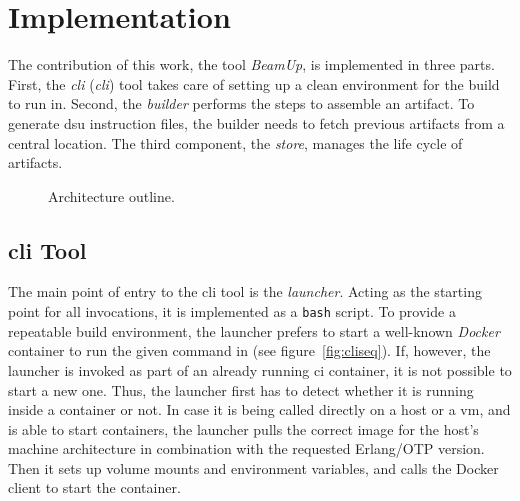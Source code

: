 \section{Implementation}

The contribution of this work, the tool \emph{BeamUp}, is implemented in three parts. First, the \emph{\acrlong{cli}} (\emph{\acrshort{cli}}) tool takes care of setting up a clean environment for the build to run in. Second, the \emph{builder} performs the  steps to assemble an artifact. To generate \acrshort{dsu} instruction files, the builder needs to fetch previous artifacts from a central location. The third component, the \emph{store}, manages the life cycle of artifacts.

\begin{figure}[h]
  \centering
  \caption{Architecture outline.}\label{fig:impl}
\end{figure}

\subsection{\acrlong{cli} Tool}

The main point of entry to the \acrshort{cli} tool is the \emph{launcher}. Acting as the starting point for all invocations, it is implemented as a \lstinline|bash| script. To provide a repeatable build environment, the launcher prefers to start a well-known \emph{Docker} container to run the given command in (see figure~\ref{fig:cliseq}). If, however, the launcher is invoked as part of an already running \acrshort{ci} container, it is not possible to start a new one. Thus, the launcher first has to detect whether it is running inside a container or not. In case it is being called directly on a host or a \acrfull{vm}, and is able to start containers, the launcher pulls the correct image for the host's machine architecture in combination with the requested Erlang/OTP version. Then it sets up volume mounts and environment variables, and calls the Docker client to start the container.

